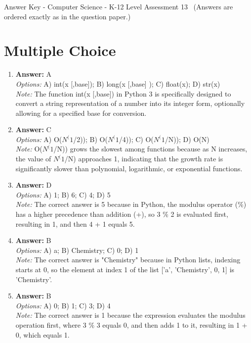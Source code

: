 \documentclass[12pt]{article}
\begin{document}
\begin{center}
Answer Key - Computer Science - K-12 Level Assessment 13 \
\small (Answers are ordered exactly as in the question paper.)
\end{center}

\section*{Multiple Choice}
\begin{enumerate}[label=\arabic*.]
\item \textbf{Answer:} A
\\ \textit{Options:} A) int(x [,base]); B) long(x [,base] ); C) float(x); D) str(x)
\\ \textit{Note:} The function int(x [,base]) in Python 3 is specifically designed to convert a string representation of a number into its integer form, optionally allowing for a specified base for conversion.
\item \textbf{Answer:} C
\\ \textit{Options:} A) O($N^(1$/2)); B) O($N^(1$/4)); C) O($N^(1$/N)); D) O(N)
\\ \textit{Note:} O($N^(1$/N)) grows the slowest among functions because as N increases, the value of $N^(1$/N) approaches 1, indicating that the growth rate is significantly slower than polynomial, logarithmic, or exponential functions.
\item \textbf{Answer:} D
\\ \textit{Options:} A) 1; B) 6; C) 4; D) 5
\\ \textit{Note:} The correct answer is 5 because in Python, the modulus operator (\%) has a higher precedence than addition (+), so 3 \% 2 is evaluated first, resulting in 1, and then 4 + 1 equals 5.
\item \textbf{Answer:} B
\\ \textit{Options:} A) a; B) Chemistry; C) 0; D) 1
\\ \textit{Note:} The correct answer is "Chemistry" because in Python lists, indexing starts at 0, so the element at index 1 of the list ['a', 'Chemistry', 0, 1] is 'Chemistry'.
\item \textbf{Answer:} B
\\ \textit{Options:} A) 0; B) 1; C) 3; D) 4
\\ \textit{Note:} The correct answer is 1 because the expression evaluates the modulus operation first, where 3 \% 3 equals 0, and then adds 1 to it, resulting in 1 + 0, which equals 1.
\end{enumerate}
\end{document}
